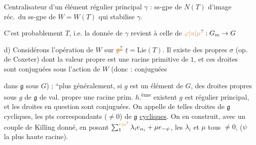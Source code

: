 
Centralisateur d'un élément régulier principal $\gamma$ : ss-gpe de $N(T)$  d'image réc.\ du ss-gpe de $W=W(T)$ qui stabilise $\gamma$.

 C'est probablement $T$, i.e.  la donnée de $\gamma$ revient à celle de $\unsure{\varphi|u|\mu}:G_{\mathrm m}\to G$

d) Considérons l'opération de $W$ sur $\deleted{\unsure{\mathfrak g}}$ $\underline t=\mathrm{Lie}(T)$. Il existe des  propres  $\sigma$ (op. de Coxeter) dont la valeur propre est une racine primitive de $1$,  et ces droites sont conjuguées sous l'action de $W$ (donc :  conjuguées

dans $\mathfrak g$ sous $G$) ;  ``plus généralement, si $g$ est un élément  de $G$, des  droites propres sous $g$ de $\mathfrak g$ de val. propre une racine prim. $h$.\textsuperscript{ème} existent  $g$ est régulier principal, et les droites en question sont conjuguées. On  appelle de telles droites de $\mathfrak g$ cycliques, les pts correspondants ($\ne 0$) de $\mathfrak g$ \uline{cycliques}.  On en construit, avec un couple de Killing donné, en posant $\sum_{1}^{\unsure{r|n}}\lambda_i e_{\alpha_i}+\mu e_{-\psi}$, les $\lambda_i$ et $\mu$ tous $\ne 0$, ($\psi$ la plus haute racine). \unsure{$\Vert$}

